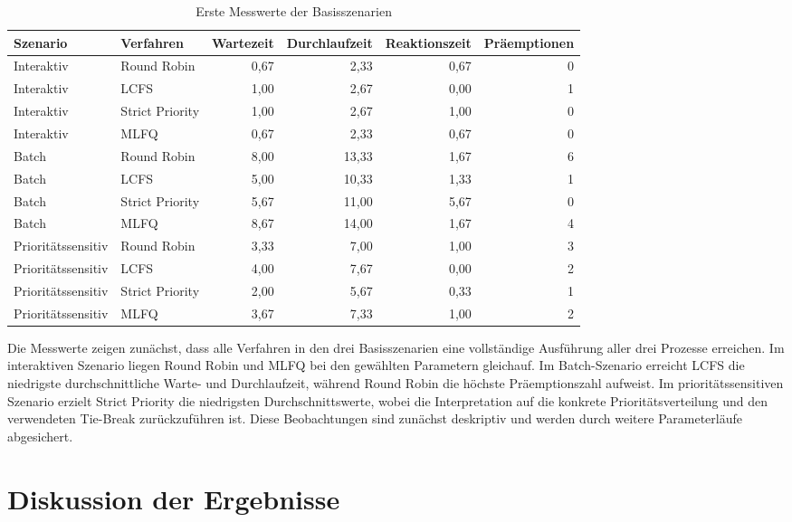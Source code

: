 \begin{table}[htbp]
    \centering
    \scriptsize
    \caption{Erste Messwerte der Basisszenarien}
    \label{tab:erste-messergebnisse}
    \begin{tabular}{llrrrr}
        \toprule
        Szenario & Verfahren & Wartezeit & Durchlaufzeit & Reaktionszeit & Präemptionen \\
        \midrule
        Interaktiv & Round Robin & 0,67 & 2,33 & 0,67 & 0 \\
        Interaktiv & LCFS & 1,00 & 2,67 & 0,00 & 1 \\
        Interaktiv & Strict Priority & 1,00 & 2,67 & 1,00 & 0 \\
        Interaktiv & MLFQ & 0,67 & 2,33 & 0,67 & 0 \\
        Batch & Round Robin & 8,00 & 13,33 & 1,67 & 6 \\
        Batch & LCFS & 5,00 & 10,33 & 1,33 & 1 \\
        Batch & Strict Priority & 5,67 & 11,00 & 5,67 & 0 \\
        Batch & MLFQ & 8,67 & 14,00 & 1,67 & 4 \\
        Prioritätssensitiv & Round Robin & 3,33 & 7,00 & 1,00 & 3 \\
        Prioritätssensitiv & LCFS & 4,00 & 7,67 & 0,00 & 2 \\
        Prioritätssensitiv & Strict Priority & 2,00 & 5,67 & 0,33 & 1 \\
        Prioritätssensitiv & MLFQ & 3,67 & 7,33 & 1,00 & 2 \\
        \bottomrule
    \end{tabular}
\end{table}

Die Messwerte zeigen zunächst, dass alle Verfahren in den drei Basisszenarien eine vollständige Ausführung aller drei Prozesse erreichen. Im interaktiven Szenario liegen Round Robin und MLFQ bei den gewählten Parametern gleichauf. Im Batch-Szenario erreicht LCFS die niedrigste durchschnittliche Warte- und Durchlaufzeit, während Round Robin die höchste Präemptionszahl aufweist. Im prioritätssensitiven Szenario erzielt Strict Priority die niedrigsten Durchschnittswerte, wobei die Interpretation auf die konkrete Prioritätsverteilung und den verwendeten Tie-Break zurückzuführen ist. Diese Beobachtungen sind zunächst deskriptiv und werden durch weitere Parameterläufe abgesichert.

\section{Diskussion der Ergebnisse}

